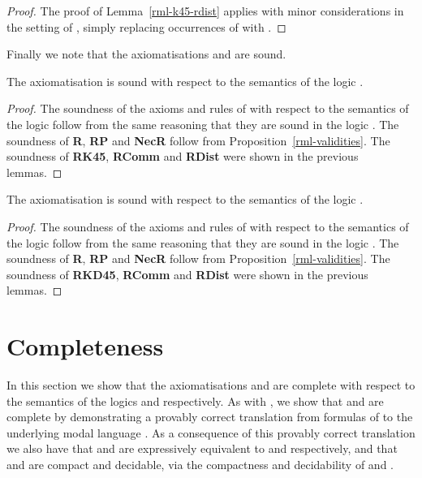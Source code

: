 \begin{proof}
The proof of Lemma~\ref{rml-k45-rdist} applies with minor considerations in the setting of \logicRmlKD{}, simply replacing occurrences of \classKFF{} with \classKD{}.
\end{proof}

Finally we note that the axiomatisations \axiomRmlKFF{} and \axiomRmlKD{} are sound.

\begin{lemma}\label{rml-k45-sound}
The axiomatisation \axiomRmlKFF{} is sound with respect to the semantics of the logic \logicRmlKFF{}.
\end{lemma}

\begin{proof}
The soundness of the axioms and rules of \axiomKFF{} with respect to the semantics of the logic \logicRmlKFF{} follow from the same reasoning that they are sound in the logic \logicKFF{}.
The soundness of {\bf R}, {\bf RP} and {\bf NecR} follow from Proposition~\ref{rml-validities}.
The soundness of {\bf RK45}, {\bf RComm} and {\bf RDist} were shown in the previous lemmas.
\end{proof}

\begin{lemma}\label{rml-kd45-sound}
The axiomatisation \axiomRmlKD{} is sound with respect to the semantics of the logic \logicRmlKD{}.
\end{lemma}

\begin{proof}
The soundness of the axioms and rules of \axiomKD{} with respect to the semantics of the logic \logicRmlKD{} follow from the same reasoning that they are sound in the logic \logicKD{}.
The soundness of {\bf R}, {\bf RP} and {\bf NecR} follow from Proposition~\ref{rml-validities}.
The soundness of {\bf RKD45}, {\bf RComm} and {\bf RDist} were shown in the previous lemmas.
\end{proof}

\pagebreak

\section{Completeness}\label{rml-kd45-completeness}

In this section we show that the axiomatisations \axiomRmlKFF{} and \axiomRmlKD{} are complete with respect to the semantics of the logics \logicRmlKFF{} and \axiomRmlKD{} respectively.
As with \axiomRmlK{}, we show that \axiomRmlKFF{} and \axiomRmlKD{} are complete by demonstrating a provably correct translation from formulas of \langRml{} to the underlying modal language \langMl{}.
As a consequence of this provably correct translation we also have that \logicRmlKFF{} and \logicRmlKD{} are expressively equivalent to \logicKFF{} and \logicRmlKD{} respectively, and that \logicRmlKFF{} and \logicRmlKD{} are compact and decidable, via the compactness and decidability of \logicKFF{} and \logicKD{}.

